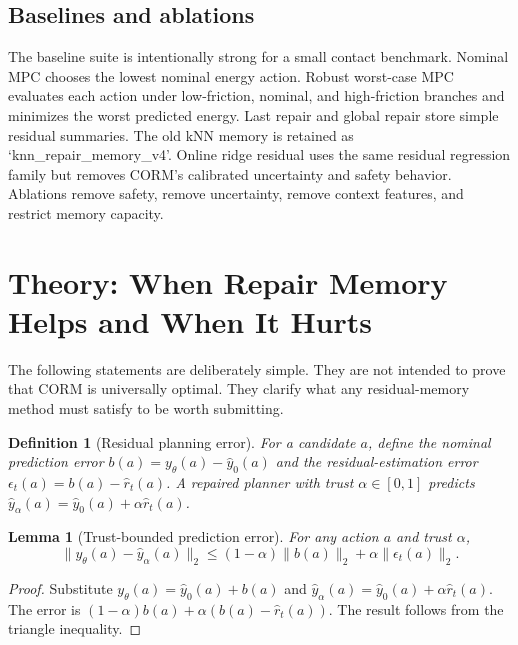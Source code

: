 \documentclass{article}
\newtheorem{definition}{Definition}
\newtheorem{lemma}{Lemma}
\begin{document}
\subsection{Baselines and ablations}

The baseline suite is intentionally strong for a small contact benchmark. Nominal MPC chooses the lowest nominal energy action. Robust worst-case MPC evaluates each action under low-friction, nominal, and high-friction branches and minimizes the worst predicted energy. Last repair and global repair store simple residual summaries. The old kNN memory is retained as `knn\_repair\_memory\_v4'. Online ridge residual uses the same residual regression family but removes CORM's calibrated uncertainty and safety behavior. Ablations remove safety, remove uncertainty, remove context features, and restrict memory capacity.

\section{Theory: When Repair Memory Helps and When It Hurts}

The following statements are deliberately simple. They are not intended to prove that CORM is universally optimal. They clarify what any residual-memory method must satisfy to be worth submitting.

\begin{definition}[Residual planning error]
For a candidate $a$, define the nominal prediction error $b(a)=y_\theta(a)-\hat y_0(a)$ and the residual-estimation error $\epsilon_t(a)=b(a)-\hat r_t(a)$. A repaired planner with trust $\alpha\in[0,1]$ predicts $\hat y_\alpha(a)=\hat y_0(a)+\alpha \hat r_t(a)$.
\end{definition}

\begin{lemma}[Trust-bounded prediction error]
For any action $a$ and trust $\alpha$,
\begin{equation}
\|y_\theta(a)-\hat y_\alpha(a)\|_2 \le (1-\alpha)\|b(a)\|_2+\alpha\|\epsilon_t(a)\|_2.
\end{equation}
\end{lemma}

\begin{proof}
Substitute $y_\theta(a)=\hat y_0(a)+b(a)$ and $\hat y_\alpha(a)=\hat y_0(a)+\alpha\hat r_t(a)$. The error is $(1-\alpha)b(a)+\alpha(b(a)-\hat r_t(a))$. The result follows from the triangle inequality.
\end{proof}
\end{document}
